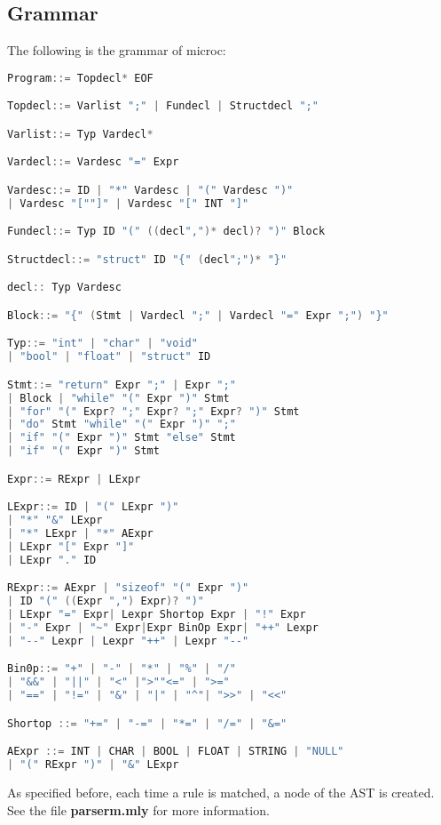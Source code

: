 \documentclass{article}
\begin{document}
\subsection{Grammar}
The following is the grammar of microc:
\begin{lstlisting}[language=C, basicstyle=\ttfamily\fontsize{8pt}{14pt}, keywordstyle=\color{blue}, commentstyle=\color{green}]
Program::= Topdecl* EOF

Topdecl::= Varlist ";" | Fundecl | Structdecl ";"

Varlist::= Typ Vardecl*

Vardecl::= Vardesc "=" Expr

Vardesc::= ID | "*" Vardesc | "(" Vardesc ")"
| Vardesc "[""]" | Vardesc "[" INT "]"

Fundecl::= Typ ID "(" ((decl",")* decl)? ")" Block

Structdecl::= "struct" ID "{" (decl";")* "}"

decl:: Typ Vardesc

Block::= "{" (Stmt | Vardecl ";" | Vardecl "=" Expr ";") "}"

Typ::= "int" | "char" | "void"
| "bool" | "float" | "struct" ID

Stmt::= "return" Expr ";" | Expr ";"
| Block | "while" "(" Expr ")" Stmt
| "for" "(" Expr? ";" Expr? ";" Expr? ")" Stmt
| "do" Stmt "while" "(" Expr ")" ";"
| "if" "(" Expr ")" Stmt "else" Stmt
| "if" "(" Expr ")" Stmt

Expr::= RExpr | LExpr

LExpr::= ID | "(" LExpr ")"
| "*" "&" LExpr
| "*" LExpr | "*" AExpr
| LExpr "[" Expr "]"
| LExpr "." ID

RExpr::= AExpr | "sizeof" "(" Expr ")"
| ID "(" ((Expr ",") Expr)? ")"
| LExpr "=" Expr| Lexpr Shortop Expr | "!" Expr
| "-" Expr | "~" Expr|Expr BinOp Expr| "++" Lexpr
| "--" Lexpr | Lexpr "++" | Lexpr "--"

Bin0p::= "+" | "-" | "*" | "%" | "/"
| "&&" | "||" | "<" |">""<=" | ">="
| "==" | "!=" | "&" | "|" | "^"| ">>" | "<<"

Shortop ::= "+=" | "-=" | "*=" | "/=" | "&="

AExpr ::= INT | CHAR | BOOL | FLOAT | STRING | "NULL"
| "(" RExpr ")" | "&" LExpr
\end{lstlisting}
As specified before, each time a rule is matched, a node of the AST is created. See the file \textbf{parserm.mly} for more information.
\end{document}
